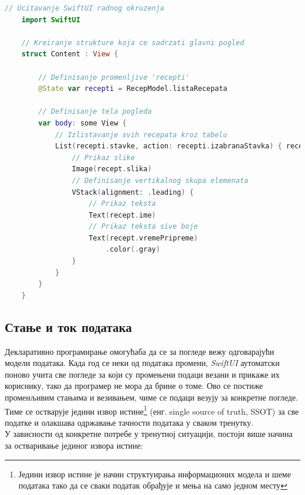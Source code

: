 \documentclass[12pt,oneside]{memoir}
\begin{document}
\begin{lstlisting}[caption=\textit{{Пример SwiftUI кода}}, label={lst:Пример SwiftUI кода}, language=Swift, frame=single]
    // Ucitavanje SwiftUI radnog okruzenja
    import SwiftUI
    
    // Kreiranje strukture koja ce sadrzati glavni pogled
    struct Content : View {
    
        // Definisanje promenljive 'recepti'
        @State var recepti = RecepModel.listaRecepata
        
        // Definisanje tela pogleda
        var body: some View {
            // Izlistavanje svih recepata kroz tabelu
            List(recepti.stavke, action: recepti.izabranaStavka) { recept in
                // Prikaz slike
                Image(recept.slika)
                // Definisanje vertikalnog skupa elemenata
                VStack(alignment: .leading) {
                    // Prikaz teksta
                    Text(recept.ime)
                    // Prikaz teksta sive boje
                    Text(recept.vremePripreme)
                        .color(.gray)
                }
            }
        } 
    }
\end{lstlisting}

\subsection{Стање и ток података}
\label{subsec:Стање и ток података}

\indent Декларативно програмирање омогућаба да се за погледе вежу одговарајући модели података. Када год се неки од података промени, \textit{SwiftUI} аутоматски поново учита све погледе за који су промењени подаци везани и прикаже их кориснику, тако да програмер не мора да брине о томе. Ово се постиже променљивим стањима и везивањем, чиме се подаци везују за конкретне погледе. Тиме се остварује једини извор истине\footnote{Једини извор истине је начин структуирања информационих модела и шеме података тако да се сваки податак обрађује и мења на само једном месту} (енг. single source of truth, SSOT) за све податке и олакшава одржавање тачности података у сваком тренутку. 
\\
\indent У зависности од конкретне потребе у тренутној ситуацији, постоји више начина за остваривање јединог извора истине:
\end{document}
